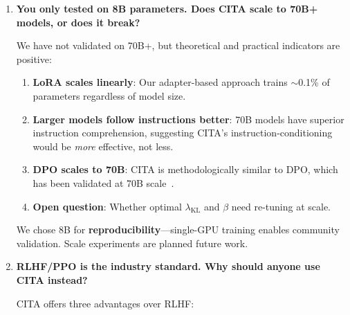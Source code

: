 \begin{enumerate}[label=\textbf{Q\arabic*.}, leftmargin=*, itemsep=8pt]
Without KL, the model collapses to a single dominant instruction-response pattern, ``forgetting'' other instruction types. The KL term maintains proximity to the reference policy's behavioral diversity.

\textbf{Intuition}: Instruction-conditioned learning requires the model to maintain \textit{multiple} behavioral modes simultaneously. KL prevents any single mode from dominating.

\vspace{4mm}

\item \textbf{You only tested on 8B parameters. Does CITA scale to 70B+ models, or does it break?}

 We have not validated on 70B+, but theoretical and practical indicators are positive:

\begin{enumerate}[leftmargin=*,itemsep=2pt]
    \item \textbf{LoRA scales linearly}: Our adapter-based approach trains $\sim$0.1\% of parameters regardless of model size.

    \item \textbf{Larger models follow instructions better}: 70B models have superior instruction comprehension, suggesting CITA's instruction-conditioning would be \textit{more} effective, not less.

    \item \textbf{DPO scales to 70B}: CITA is methodologically similar to DPO, which has been validated at 70B scale~\cite{rafailov2023direct}.

    \item \textbf{Open question}: Whether optimal $\lambda_{\text{KL}}$ and $\beta$ need re-tuning at scale.
\end{enumerate}

We chose 8B for \textbf{reproducibility}---single-GPU training enables community validation. Scale experiments are planned future work.

\vspace{4mm}

\item \textbf{RLHF/PPO is the industry standard. Why should anyone use CITA instead?}

 CITA offers three advantages over RLHF:


\end{enumerate}
